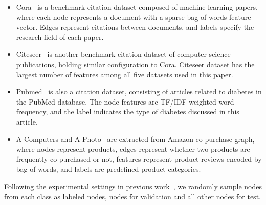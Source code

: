 \documentclass[sigconf]{acmart}
\begin{document}
\begin{itemize}
    \item Cora~\cite{sen2008collective} is a benchmark citation dataset composed of machine learning papers, where each node represents a document with a sparse bag-of-words feature vector. Edges represent citations between documents, and labels specify the research field of each paper. 
    \item Citeseer~\cite{sen2008collective} is another benchmark citation dataset of computer science publications, holding similar configuration to Cora. Citeseer dataset has the largest number of features among all five datasets used in this paper.
    \item Pubmed~\cite{namata2012query} is also a citation dataset, consisting of articles related to diabetes in the PubMed database. The node features are TF/IDF weighted word frequency, and the label indicates the type of diabetes discussed in this article.
    \item A-Computers and A-Photo~\cite{shchur2018pitfalls} are extracted from Amazon co-purchase graph, where nodes represent products, edges represent whether two products are frequently co-purchased or not, features represent product reviews encoded by bag-of-words, and labels are predefined product categories.
\end{itemize}

Following the experimental settings in previous work~\cite{shchur2018pitfalls}, we randomly sample  nodes from each class as labeled nodes,  nodes for validation and all other nodes for test. 
\end{document}
